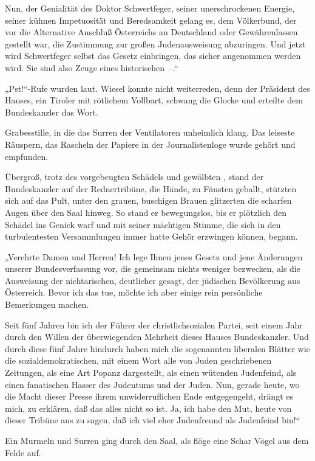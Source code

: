 Nun, der Genialität des Doktor Schwertfeger, seiner unerschrockenen
Energie, seiner kühnen Impetuosität und Beredsamkeit gelang es, dem
Völkerbund, der vor die Alternative Anschluß Österreichs an
Deutschland oder Gewährenlassen gestellt war, die Zustimmung zur
großen Judenausweisung abzuringen. Und jetzt wird Schwertfeger
selbst das Gesetz einbringen, das sicher angenommen werden wird.
Sie sind also Zeuge eines historischen~–.“

„Pst!“-Rufe wurden laut. Wiesel konnte nicht weiterreden, denn der
Präsident des Hauses, ein Tiroler mit  rötlichem
Vollbart, schwang die Glocke und erteilte dem Bundeskanzler das
Wort.

Grabesstille, in die das Surren der Ventilatoren unheimlich klang.
Das leiseste Räuspern, das Rascheln der Papiere in der
Journalistenloge wurde gehört und empfunden.

Übergroß, trotz des vorgebeugten Schädels und gewölbten 
,
stand der Bundeskanzler auf der Rednertribüne, die Hände, zu
Fäusten geballt, stützten sich auf das Pult, unter den grauen,
buschigen Brauen glitzerten die scharfen Augen über den Saal
hinweg. So stand er bewegungslos, bis er plötzlich den Schädel ins
Genick warf und mit seiner mächtigen Stimme, die sich in den
turbulentesten Versammlungen immer hatte Gehör erzwingen können,
begann.

„Verehrte Damen und Herren! Ich lege Ihnen jenes Gesetz und jene
Änderungen unserer Bundesverfassung vor, die gemeinsam nichts
weniger bezwecken, als die Ausweisung der nichtarischen, deutlicher
gesagt, der jüdischen Bevölkerung aus Österreich. Bevor ich das
tue, möchte ich aber einige rein persönliche Bemerkungen machen.

Seit fünf Jahren bin ich der Führer der christlichsozialen Partei,
seit einem Jahr durch den Willen der überwiegenden Mehrheit dieses
Hauses Bundeskanzler. Und durch diese fünf Jahre hindurch haben
mich die sogenannten liberalen Blätter wie die
sozialdemokratischen, mit einem Wort alle von Juden geschriebenen
Zeitungen, als eine Art Popanz dargestellt, als einen wütenden
 Judenfeind, als einen fanatischen Hasser des
Judentums und der Juden. Nun, gerade heute, wo die Macht dieser
Presse ihrem unwiderruflichen Ende entgegengeht, drängt es mich, zu
erklären, daß das alles nicht so ist. Ja, ich habe den Mut, heute
von dieser Tribüne aus zu sagen, daß ich viel eher Judenfreund als
Judenfeind bin!“

Ein Murmeln und Surren ging durch den Saal, als flöge eine Schar
Vögel aus dem Felde auf.

